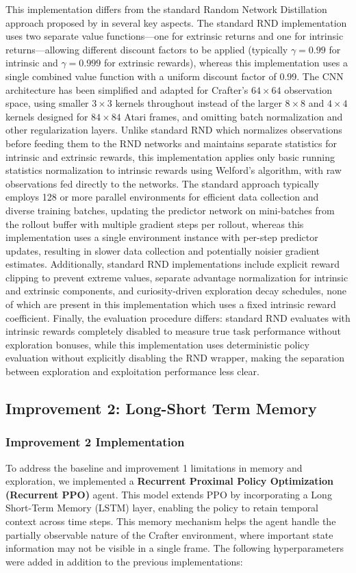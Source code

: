 \documentclass[twocolumn]{article}
\begin{document}
This implementation differs from the standard Random Network Distillation approach proposed by \cite{burda2018exploration} in several key aspects. The standard RND implementation uses two separate value functions---one for extrinsic returns and one for intrinsic returns---allowing different discount factors to be applied (typically $\gamma=0.99$ for intrinsic and $\gamma=0.999$ for extrinsic rewards), whereas this implementation uses a single combined value function with a uniform discount factor of 0.99. The CNN architecture has been simplified and adapted for Crafter's $64 \times 64$ observation space, using smaller $3 \times 3$ kernels throughout instead of the larger $8 \times 8$ and $4 \times 4$ kernels designed for $84 \times 84$ Atari frames, and omitting batch normalization and other regularization layers. Unlike standard RND which normalizes observations before feeding them to the RND networks and maintains separate statistics for intrinsic and extrinsic rewards, this implementation applies only basic running statistics normalization to intrinsic rewards using Welford's algorithm, with raw observations fed directly to the networks. The standard approach typically employs 128 or more parallel environments for efficient data collection and diverse training batches, updating the predictor network on mini-batches from the rollout buffer with multiple gradient steps per rollout, whereas this implementation uses a single environment instance with per-step predictor updates, resulting in slower data collection and potentially noisier gradient estimates. Additionally, standard RND implementations include explicit reward clipping to prevent extreme values, separate advantage normalization for intrinsic and extrinsic components, and curiosity-driven exploration decay schedules, none of which are present in this implementation which uses a fixed intrinsic reward coefficient. Finally, the evaluation procedure differs: standard RND evaluates with intrinsic rewards completely disabled to measure true task performance without exploration bonuses, while this implementation uses deterministic policy evaluation without explicitly disabling the RND wrapper, making the separation between exploration and exploitation performance less clear.
\subsection*{Improvement 2: Long-Short Term Memory}

\subsubsection*{Improvement 2 Implementation}
To address the baseline and improvement 1 limitations in memory and exploration, we implemented a \textbf{Recurrent Proximal Policy Optimization (Recurrent PPO)} agent. This model extends PPO by incorporating a Long Short-Term Memory (LSTM) layer, enabling the policy to retain temporal context across time steps. This memory mechanism helps the agent handle the partially observable nature of the Crafter environment, where important state information may not be visible in a single frame.
The following hyperparameters were added in addition to the previous implementations:
\end{document}
